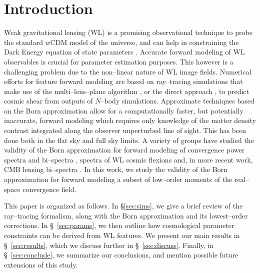 \documentclass[reprint,aps,prd,superscriptaddress,showkeys,showpacs]{revtex4-1}
\begin{document}

\maketitle



\section{Introduction}
%
Weak gravitational lensing (WL) is a promising observational technique to probe the standard $w$CDM model of the universe, and can help in constraining the Dark Energy equation of state parameters \citep{wlreview}. Accurate forward modeling of WL observables is crucial for parameter estimation purposes. This however is a challenging problem due to the non--linear nature of WL image fields. Numerical efforts for feature forward modeling are based on ray--tracing simulations that make use of the multi--lens--plane algorithm \citep{RayTracingJain,RayTracingHartlap,RayTracingPN}, or the direct approach \citep{RayTracingBecker,RayTracingBode,RayTracingBarreira}, to predict cosmic shear from outputs of $N$--body simulations. Approximate techniques based on the Born approximation allow for a computationally faster, but potentially inaccurate, forward modeling which requires only knowledge of the matter density contrast integrated along the observer unperturbed line of sight. This has been done both in the flat sky \citep{RayTracingHartlap} and full sky \citep{Fosalba1,Fosalba2} limits. A variety of groups have studied the validity of the Born approximation for forward modeling of convergence power spectra \citep{HirataKrause} and bi--spectra \citep{WLBispectrumDodelson}, spectra of WL cosmic flexions \citep{BornFlexion} and, in more recent work, CMB lensing bi--spectra \citep{CMBPrattenLewis}. In this work, we study the validity of the Born approximation for forward modeling a subset of low--order moments of the real--space convergence field. 

This paper is organized as follows.  In \S\ref{sec:sims}, we give a brief review of the ray--tracing formalism, along with the Born approximation and its lowest--order corrections. In \S~\ref{sec:params}, we then outline how cosmological parameter constraints can be derived from WL features. We present our main results in \S~\ref{sec:results}, which we discuss further in \S~\ref{sec:discuss}.  Finally, in \S~\ref{sec:conclude}, we summarize our conclusions, and mention possible future extensions of this study.       
\end{document}

